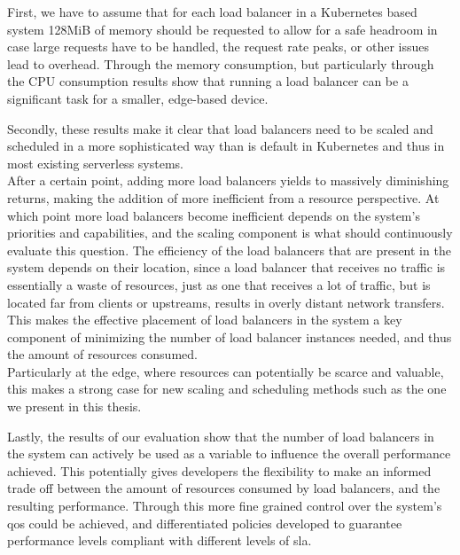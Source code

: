 First, we have to assume that for each load balancer in a Kubernetes based system 128MiB of memory should be requested to allow for a safe headroom in case large requests have to be handled, the request rate peaks, or other issues lead to overhead.
Through the memory consumption, but particularly through the CPU consumption results show that running a load balancer can be a significant task for a smaller, edge-based device.

Secondly, these results make it clear that load balancers need to be scaled and scheduled in a more sophisticated way than is default in Kubernetes and thus in most existing serverless systems.\\
After a certain point, adding more load balancers yields to massively diminishing returns, making the addition of more inefficient from a resource perspective.
At which point more load balancers become inefficient depends on the system's priorities and capabilities, and the scaling component is what should continuously evaluate this question.
The efficiency of the load balancers that are present in the system depends on their location, since a load balancer that receives no traffic is essentially a waste of resources, just as one that receives a lot of traffic, but is located far from clients or upstreams, results in overly distant network transfers.
This makes the effective placement of load balancers in the system a key component of minimizing the number of load balancer instances needed, and thus the amount of resources consumed.\\
Particularly at the edge, where resources can potentially be scarce and valuable, this makes a strong case for new scaling and scheduling methods such as the one we present in this thesis.

Lastly, the results of our evaluation show that the number of load balancers in the system can actively be used as a variable to influence the overall performance achieved.
This potentially gives developers the flexibility to make an informed trade off between the amount of resources consumed by load balancers, and the resulting performance.
Through this more fine grained control over the system's \gls{qos} could be achieved, and differentiated policies developed to guarantee performance levels compliant with different levels of \gls{sla}.
